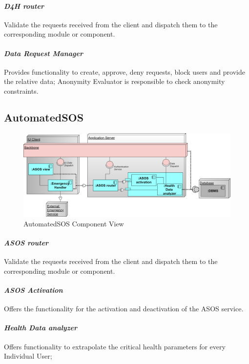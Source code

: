 \paragraph{\textit{D4H router}} Validate the requests received from the client and dispatch them to the corresponding module or component.
\paragraph{\textit{Data Request Manager}} Provides functionality to create, approve, deny requests, block users and provide the relative data; Anonymity Evaluator is responsible to check anonymity constraints. 
\subsection{AutomatedSOS}
\label{subsect:ASOSComponentView}
\begin{figure}[H]
 \caption{AutomatedSOS Component View}
\centering
\includegraphics[width = \textwidth]{sections/architecturalDesign/ASOSDiagram.png}
\end{figure}
\paragraph{\textit{ASOS router}} Validate the requests received from the client and dispatch them to the corresponding module or component.
\paragraph{\textit{ASOS Activation}} Offers the functionality for the activation and deactivation of the ASOS service.
\paragraph{\textit{Health Data analyzer}} Offers functionality to extrapolate the critical health parameters for every Individual User;
